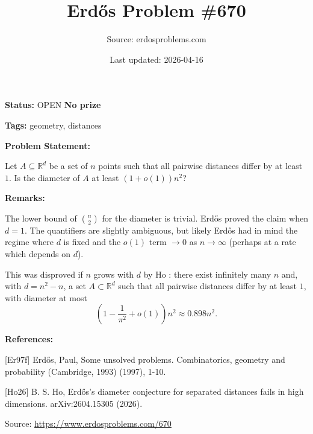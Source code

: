 \documentclass{article}
\title{Erd\H{o}s Problem \#670}
\date{Last updated: 2026-04-16}
\author{Source: erdosproblems.com}
\begin{document}
\maketitle

\noindent\textbf{Status:} OPEN \quad \textbf{No prize}

\noindent\textbf{Tags:} geometry, distances

\medskip
\noindent\textbf{Problem Statement:}

Let $A\subseteq \mathbb{R}^d$ be a set of $n$ points such that all pairwise distances differ by at least $1$. Is the diameter of $A$ at least $(1+o(1))n^2$?

\bigskip
\noindent\textbf{Remarks:}

The lower bound of $\binom{n}{2}$ for the diameter is trivial. Erd\H{o}s \cite{Er97f} proved the claim when $d=1$. The quantifiers are slightly ambiguous, but likely Erd\H{o}s had in mind the regime where $d$ is fixed and the $o(1)$ term $\to 0$ as $n\to \infty$ (perhaps at a rate which depends on $d$).

This was disproved if $n$ grows with $d$ by Ho \cite{Ho26}: there exist infinitely many $n$ and, with $d=n^2-n$, a set $A\subset \mathbb{R}^d$ such that all pairwise distances differ by at least $1$, with diameter at most\[\left(1-\frac{1}{\pi^2}+o(1)\right)n^2\approx 0.898n^2.\]

\bigskip
\noindent\textbf{References:}

[Er97f] Erd\H{o}s, Paul, Some unsolved problems. Combinatorics, geometry and probability (Cambridge, 1993) (1997), 1-10.
 
 [Ho26] B. S. Ho, Erd\H{o}s's diameter conjecture for separated distances fails in high dimensions. arXiv:2604.15305 (2026).

\bigskip
\noindent\small{Source: \url{https://www.erdosproblems.com/670}}
\end{document}
